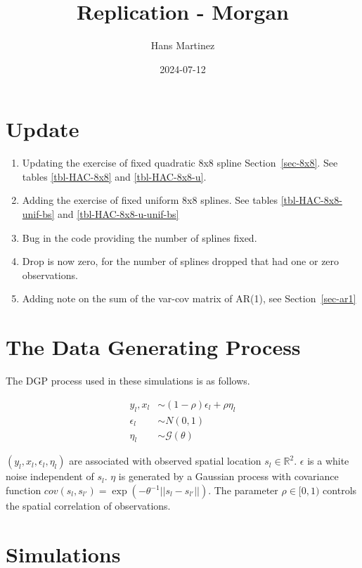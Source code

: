 \documentclass[
]{article}
\title{Replication - Morgan}
\author{Hans Martinez}
\date{2024-07-12}
\providecommand{\tightlist}{%
  \setlength{\itemsep}{0pt}\setlength{\parskip}{0pt}}\usepackage{longtable,booktabs,array}
\begin{document}
\maketitle

\section*{Update}\label{update}

\begin{enumerate}
\def\labelenumi{\arabic{enumi}.}
\tightlist
\item
  Updating the exercise of fixed quadratic 8x8 spline
  Section~\ref{sec-8x8}. See tables \ref{tbl-HAC-8x8} and
  \ref{tbl-HAC-8x8-u}.
\item
  Adding the exercise of fixed uniform 8x8 splines. See tables
  \ref{tbl-HAC-8x8-unif-bs} and \ref{tbl-HAC-8x8-u-unif-bs}
\item
  Bug in the code providing the number of splines fixed.
\item
  Drop is now zero, for the number of splines dropped that had one or
  zero observations.
\item
  Adding note on the sum of the var-cov matrix of AR(1), see
  Section~\ref{sec-ar1}
\end{enumerate}

\section{The Data Generating Process}\label{the-data-generating-process}

The DGP process used in these simulations is as follows.

\[
\begin{aligned}
    y_l, x_l &\sim (1-\rho)\epsilon_l +\rho \eta_l \\
    \epsilon_l &\sim N(0,1) \\
    \eta_l &\sim \mathcal{G}(\theta)
\end{aligned}
\]

\((y_l,x_l,\epsilon_l,\eta_l)\) are associated with observed spatial
location \(s_l \in \mathbb{R}^2\). \(\epsilon\) is a white noise
independent of \(s_l\). \(\eta\) is generated by a Gaussian process with
covariance function
\(cov(s_l,s_{l'})=\exp(-\theta^{-1}||s_l-s_{l'}||)\). The parameter
\(\rho\in[0,1)\) controls the spatial correlation of observations.

\section{Simulations}\label{simulations}
\end{document}
